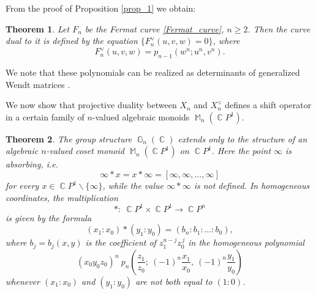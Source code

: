 \documentclass[14pt, dvipsnames]{extarticle}
\theoremstyle{plain}
\newtheorem{theorem}{Theorem}
\theoremstyle{definition}
\theoremstyle{remark}
\DeclareMathOperator{\G}{\mathbb{G}}
\DeclareMathOperator{\Cc}{\mathbb{C}}
\DeclareMathOperator{\M}{\mathbb{M}}
\begin{document}
From the proof of Proposition \ref{prop_1} we obtain:

\begin{theorem}\label{Fermat_curve_theorem}
Let $F_n$ be the Fermat curve \eqref{Fermat_curve}, $n\ge 2$. Then the curve dual to it is defined by the equation $\{F_n^\vee(u,v,w)=0\}$, where
$$F_n^\vee(u,v,w)=p_{n-1}(w^n;u^n,v^n).$$
\end{theorem}

We note that these polynomials can be realized as determinants of generalized Wendt matrices \cite[Theorem 4]{BK}.

We now show that projective duality between $X_n$ and $X_n^\vee$ defines a shift operator in a certain family of $n$-valued algebraic monoids $\M_n(\Cc\!P^1)$.

\begin{theorem}\label{M_n_monoid_structure}
The group structure $\G_n(\Cc)$ extends only to the structure of an algebraic $n$-valued coset monoid $\M_n(\Cc\!P^1)$ on $\Cc\!P^1$. Here the point $\infty$ is absorbing, i.e.
$$\infty\ast x=x\ast \infty=[\infty,\infty,\dots,\infty]$$
for every $x\in \Cc\!P^1\backslash\{\infty\}$, while the value $\infty\ast \infty$ is not defined. In homogeneous coordinates, the multiplication
\[
\ast:\ \Cc\!P^1\times \Cc\!P^1\longrightarrow \Cc\!P^n
\]
is given by the formula
\begin{equation}\label{the_law}
(x_1:x_0)\ast (y_1:y_0)=(b_n:b_1:\dots:b_0),
\end{equation}
where $b_j=b_j(x,y)$ is the coefficient of $z_1^{n-j} z_0^{\,j}$ in the homogeneous polynomial
$$(x_0y_0 z_0)^n\ p_n\!\left(\frac{z_1}{z_0};\ (-1)^n\frac{x_1}{x_0},\ (-1)^n\frac{y_1}{y_0}\right)$$
whenever $(x_1:x_0)$ and $(y_1:y_0)$ are not both equal to $(1:0)$.
\end{theorem}
\end{document}

